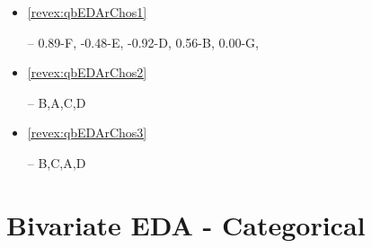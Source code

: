 \documentclass[10pt,openany]{book}\usepackage[]{graphicx}\usepackage[]{color}
\newenvironment{knitrout}{}{} %
\begin{document}
\begin{itemize}
\begin{knitrout}
{}



\end{knitrout}

  \item \hypertarget{ans:qbEDArChos1}{\ref{revex:qbEDArChos1}} -- 0.89-F, -0.48-E, -0.92-D, 0.56-B, 0.00-G,
  \item \hypertarget{ans:qbEDArChos2}{\ref{revex:qbEDArChos2}} -- B,A,C,D
  \item \hypertarget{ans:qbEDArChos3}{\ref{revex:qbEDArChos3}} -- B,C,A,D
\end{itemize}




\section*{Bivariate EDA - Categorical}
\end{document}

